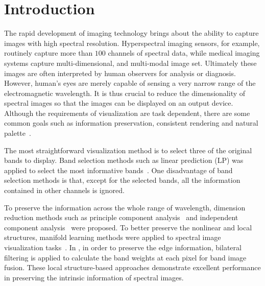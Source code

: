 \documentclass[10pt,conference,a4paper]{IEEEtran}
\begin{document}
%
\IEEEpeerreviewmaketitle



\section{Introduction}

The rapid development of imaging technology brings about the ability to capture images with high spectral resolution.
Hyperspectral imaging sensors, for example, routinely capture more than $100$ channels of spectral data, while medical imaging systems capture multi-dimensional, and multi-modal image set.
Ultimately these images are often interpreted by human observers for analysis or diagnosis.
However, human's eyes are merely capable of sensing a very narrow range of the electromagnetic wavelength.
It is thus crucial to reduce the dimensionality of spectral images so that the images can be displayed on an output device.
Although the requirements of visualization are task dependent, there are some common goals such as information preservation, consistent rendering and natural palette~\cite{jacobson2005design}.

The most straightforward visualization method is to select three of the original bands to display.
Band selection methods such as
linear prediction (LP) was applied to select the most informative bands~\cite{su2014LP}.
One disadvantage of band selection methods is that, except for the selected bands, all the information contained in other channels is ignored.

To preserve the information across the whole range of wavelength, dimension reduction methods such as principle component analysis~\cite{tyo2003principal} and independent component analysis~\cite{zhu2007evaluation} were proposed.
To better preserve the nonlinear and local structures, manifold learning methods were applied to spectral image visualization tasks~\cite{bachmann2005exploiting}.%
In \cite{kotwal2010visualization}, in order to preserve the edge information, bilateral filtering is applied to calculate the band weights at each pixel for band image fusion.
These local structure-based approaches demonstrate excellent performance in preserving the intrinsic information of spectral images.
\end{document}
